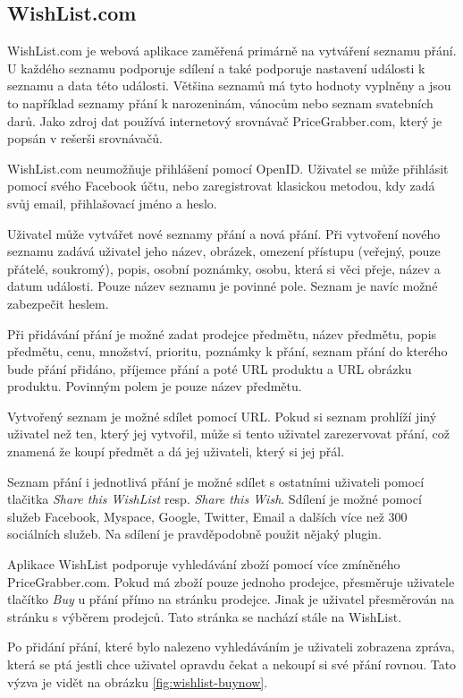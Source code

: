 \subsection{WishList.com}
WishList.com je webová aplikace zaměřená primárně na vytváření seznamu přání. U každého seznamu podporuje sdílení a také podporuje nastavení události k seznamu a data této události. Většina seznamů má tyto hodnoty vyplněny a jsou to například seznamy přání k narozeninám, vánocům nebo seznam svatebních darů. Jako zdroj dat používá internetový srovnávač PriceGrabber.com, který je popsán v rešerši srovnávačů.

WishList.com neumožňuje přihlášení pomocí OpenID. Uživatel se může přihlásit pomocí svého Facebook účtu, nebo zaregistrovat klasickou metodou, kdy zadá svůj email, přihlašovací jméno a heslo.

Uživatel může vytvářet nové seznamy přání a nová přání. Při vytvoření nového seznamu zadává uživatel jeho název, obrázek, omezení přístupu (veřejný, pouze přátelé, soukromý), popis, osobní poznámky, osobu, která si věci přeje, název a datum události. Pouze název seznamu je povinné pole. Seznam je navíc možné zabezpečit heslem.

Při přidávání přání je možné zadat prodejce předmětu, název předmětu, popis předmětu, cenu, množství, prioritu, poznámky k přání, seznam přání do kterého bude přání přidáno, příjemce přání a poté URL produktu a URL obrázku produktu. Povinným polem je pouze název předmětu.

Vytvořený seznam je možné sdílet pomocí URL. Pokud si seznam prohlíží jiný uživatel než ten, který jej vytvořil, může si tento uživatel zarezervovat přání, což znamená že koupí předmět a dá jej uživateli, který si jej přál.

Seznam přání i jednotlivá přání je možné sdílet s ostatními uživateli pomocí tlačitka \emph{Share this WishList} resp. \emph{Share this Wish}. Sdílení je možné pomocí služeb Facebook, Myspace, Google, Twitter, Email a dalších více než 300 sociálních služeb. Na sdílení je pravděpodobně použit nějaký plugin.

Aplikace WishList podporuje vyhledávání zboží pomocí více zmíněného PriceGrabber.com. Pokud má zboží pouze jednoho prodejce, přesměruje uživatele tlačítko \emph{Buy} u přání přímo na stránku prodejce. Jinak je uživatel přesměrován na stránku s výběrem prodejců. Tato stránka se nachází stále na WishList.

Po přidání přání, které bylo nalezeno vyhledáváním je uživateli zobrazena zpráva, která se ptá jestli chce uživatel opravdu čekat a nekoupí si své přání rovnou. Tato výzva je vidět na obrázku \ref{fig:wishlist-buynow}.

